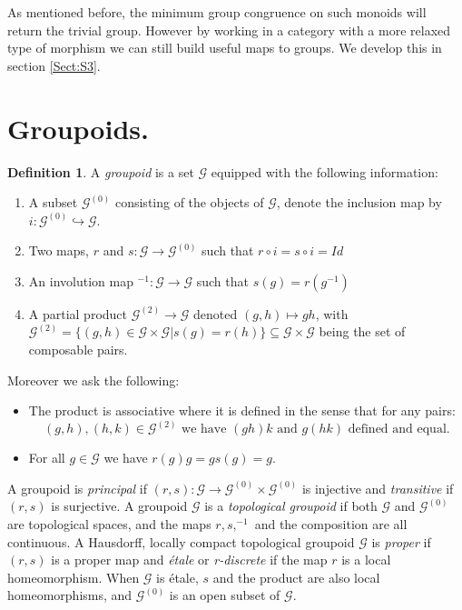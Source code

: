 \documentclass[11pt,]{amsbook}
\theoremstyle{plain}
\theoremstyle{definition}%
\newtheorem{definition}[theorem]{Definition}%
\theoremstyle{remark}%
\newcommand{\G}{\mathcal{G}}
\begin{document}
As mentioned before, the minimum group congruence on such monoids will return the trivial group. However by working in a category with a more relaxed type of morphism we can still build useful maps to groups. We develop this in section \ref{Sect:S3}.

\section{Groupoids.}

\begin{definition}\label{def:grpoid2}
A \textit{groupoid} is a set $\G$ equipped with the following information:
\begin{enumerate}
\item A subset $\G^{(0)}$ consisting of the objects of $\G$, denote the inclusion map by $i: \G^{(0)}\hookrightarrow \G$. 
\item Two maps, $r$ and $s: \G  \rightarrow \G^{(0)}$ such that $r\circ i = s \circ i = Id$ 
\item An involution map $^{-1}:\G \rightarrow \G$ such that $s(g)=r(g^{-1})$
\item A partial product $\G^{(2)} \rightarrow \G$ denoted $(g,h) \mapsto gh$, with $\G^{(2)}=\lbrace (g,h) \in \G \times \G | s(g)=r(h) \rbrace\subseteq \G\times \G$ being the set of composable pairs.
\end{enumerate}
Moreover we ask the following:
\begin{itemize}
\item The product is associative where it is defined in the sense that for any pairs: 
\begin{equation*}
(g,h),(h,k)\in \G^{(2)} \mbox{ we have }(gh)k \mbox{ and } g(hk) \mbox{ defined and equal}.
\end{equation*}
\item For all $g \in \G$ we have $r(g)g=gs(g)=g$.
\end{itemize}
\end{definition}

A groupoid is \textit{principal} if $(r,s): \G \rightarrow \G^{(0)} \times \G^{(0)}$ is injective and \textit{transitive} if $(r,s)$ is surjective. A groupoid $\G$ is a \textit{topological groupoid} if both $\G$ and $\G^{(0)}$ are topological spaces, and the maps $r,s, ^{-1}$ and the composition are all continuous. A Hausdorff, locally compact topological groupoid $\G$ is \textit{proper} if $(r,s)$ is a proper map and \textit{\'etale} or \textit{r-discrete} if the map $r$ is a local homeomorphism. When $\G$ is \'etale, $s$ and the product are also local homeomorphisms, and $\G^{(0)}$ is an open subset of $\G$.
\end{document}
